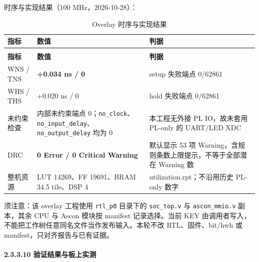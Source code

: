 时序与实现结果（100 MHz，2026-10-28）：

{\small
\renewcommand{\thetable}{2-14}
\begin{longtable}{@{}>{\raggedright\arraybackslash}p{}>{\raggedright\arraybackslash}p{}>{\raggedright\arraybackslash}p{}@{}}
\caption{Overlay 时序与实现结果}\label{tab:2-14}\\
\toprule
\textbf{指标} & \textbf{数值} & \textbf{判据} \\
\midrule
\endfirsthead
\multicolumn{3}{@{}l}{\footnotesize 续表 2-14}\\
\toprule
\textbf{指标} & \textbf{数值} & \textbf{判据} \\
\midrule
\endhead
WNS / TNS & \textbf{+0.034 ns / 0} & setup 失败端点 0/62861 \\
WHS / THS & +0.020 ns / 0 & hold 失败端点 0/62861 \\
未约束检查 & 内部未约束端点 0；\texttt{no\_\allowbreak{}\allowbreak{}clock}、\texttt{no\_\allowbreak{}\allowbreak{}input\_\allowbreak{}\allowbreak{}delay}、\texttt{no\_\allowbreak{}\allowbreak{}output\_\allowbreak{}\allowbreak{}delay} 均为 0 & 本工程无外接 PL IO，故未套用 PL-only 的 UART/LED XDC \\
DRC & \textbf{0 Error / 0 Critical Warning} & 默认显示 53 项 Warning，含规则条数上限提示，不等于全部潜在 Warning 数 \\
整机资源 & LUT 14269、FF 19691、BRAM 34.5 tile、DSP 4 & utilization.rpt；不沿用历史 PL-only 数字 \\
\bottomrule
\end{longtable}
}


须注意：该 overlay 工程使用 \texttt{rtl\_\allowbreak{}p0} 目录下的 \texttt{soc\_\allowbreak{}top.\allowbreak{}v} 与 \texttt{ascon\_\allowbreak{}mmio.\allowbreak{}v} 副本，其余 CPU 与 Ascon 模块按 manifest 记录选择。当前 KEY 由调用者写入，不能把工作树任意同名文件当作发布输入。本轮不改 RTL、固件、bit/hwh 或 manifest，只对齐报告与已有证据。

\Needspace{85pt}

\paragraph{2.3.3.10 验证结果与板上实测}

